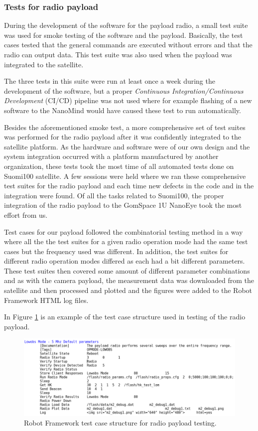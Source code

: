 \documentclass[english,12pt,a4paper,pdftex,elec,utf8]{aaltothesis}
\begin{document}
\subsubsection{Tests for radio payload}
During the development of the software for the payload radio, a small test suite was used for smoke testing of the software and the payload. Basically, the test cases tested that the general commands are executed without errors and that the radio can output data. This test suite was also used when the payload was integrated to the satellite.\par
The three tests in this suite were run at least once a week during the development of the software, but a proper \textit{Continuous Integration/Continuous Development} (CI/CD) pipeline was not used where for example flashing of a new software to the NanoMind would have caused these test to run automatically.\par
Besides the aforementioned smoke test, a more comprehensive set of test suites was performed for the radio payload after it was confidently integrated to the satellite platform. As the hardware and software were of our own design and the system integration occurred with a platform manufactured by another organization, these tests took the most time of all automated tests done on Suomi100 satellite. A few sessions were held where we ran these comprehensive test suites for the radio payload and each time new defects in the code and in the integration were found. Of all the tasks related to Suomi100, the proper integration of the radio payload to the GomSpace 1U NanoEye took the most effort from us.\par
Test cases for our payload followed the combinatorial testing method in a way where all the the test suites for a given radio operation mode had the same test cases but the frequency used was different. In addition, the test suites for different radio operation modes differed as each had a bit different parameters. These test suites then covered some amount of different parameter combinations and as with the camera payload, the measurement data was downloaded from the satellite and then processed and plotted and the figures were added to the Robot Framework HTML log files.\par 
In Figure \ref{robotradio} is an example of the test case structure used in testing of the radio payload.\par 
\begin{figure}[h!]
\centering
\includegraphics[scale=0.5]{payloadrfwtest}
\caption{Robot Framework test case structure for radio payload testing.}
\label{robotradio}
\end{figure}
\end{document}
